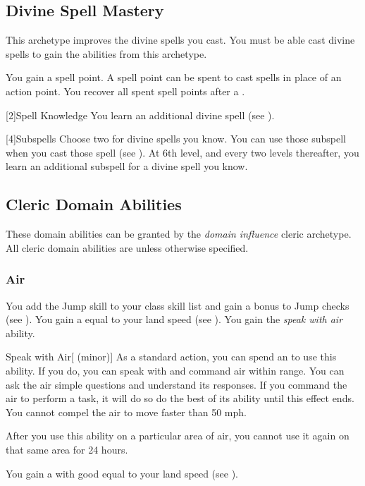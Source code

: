     \subsection{Divine Spell Mastery}
        This archetype improves the divine spells you cast.
        You must be able cast divine spells to gain the abilities from this archetype.

        You gain a spell point.
        A spell point can be spent to cast spells in place of an action point.
        You recover all spent spell points after a .

        [2]{Spell Knowledge}
        You learn an additional divine spell (see ).

        [4]{Subspells}
        Choose two  for divine spells you know.
        You can use those subspell when you cast those spell (see ).
        At 6th level, and every two levels thereafter, you learn an additional subspell for a divine spell you know.

    \subsection{Cleric Domain Abilities}\label{Cleric Domain Abilities}
        These domain abilities can be granted by the \textit{domain influence} cleric archetype.
        All cleric domain abilities are  unless otherwise specified.

        \subsubsection{Air}
             You add the Jump skill to your class skill list and gain a  bonus to Jump checks (see ).
             You gain a  equal to your land speed (see ).
             You gain the \textit{speak with air} ability.
            \begin{ability}{Speak with Air}[ (minor)]
                As a standard action, you can spend an  to use this ability.
                If you do, you can speak with and command air within \rnglong range.
                You can ask the air simple questions and understand its responses.
                If you command the air to perform a task, it will do so do the best of its ability until this effect ends.
                You cannot compel the air to move faster than 50 mph.

                After you use this ability on a particular area of air, you cannot use it again on that same area for 24 hours.
            \end{ability}
             You gain a  with good  equal to your land speed (see ).

